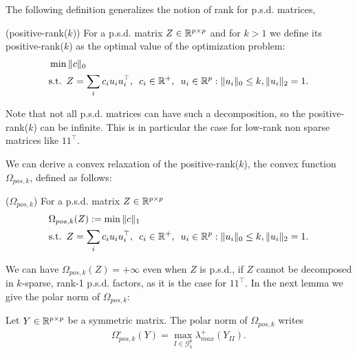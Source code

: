 \documentclass[letterpaper]{article}
\begin{document}
The following definition generalizes the notion of rank for p.s.d. matrices,
\begin{mydef}
(positive-rank($k$)) For a p.s.d. matrix $Z\in\mathbb{R}^{p\times p}$ and for $k>1$ we define its positive-rank($k$) as the optimal
value of the optimization problem:
\begin{align*}
&\min \|c\|_0 \\ 
&\text{s.t.} \enskip Z=\sum_{i} c_i u_i u_{i}^\top, \enskip c_i\in \mathbb{R}^{+}, \enskip u_{i}\in\mathbb{R}^p  :  \|u_{i}\|_0 \leq k, \|u_{i}\|_2 = 1.
\end{align*}
\end{mydef}
Note that not all p.s.d. matrices can have such a decomposition, so the positive-rank($k$) can be infinite. This is in particular the case for low-rank non sparse matrices like $11^{\top}$. 

We can derive a convex relaxation of the positive-rank($k$), the convex function $\Omega_{pos,k}$, defined as follows:
\begin{mydef}
($\Omega_{pos,k}$) For a p.s.d. matrix $Z\in\mathbb{R}^{p\times p}$ 
\begin{align*}
&\Omega_{pos,k}(Z):=\min \|c\|_1 \\ 
&\text{s.t.} \enskip Z=\sum_{i} c_i u_i u_{i}^\top, \enskip 
c_i\in \mathbb{R}^{+}, \enskip u_{i}\in\mathbb{R}^p  :   \|u_{i}\|_0 \leq k, \|u_{i}\|_2 = 1.
\end{align*}
\end{mydef}

We can have $\Omega_{pos,k}(Z)=+\infty$ even when $Z$ is p.s.d., if $Z$ cannot be decomposed in $k$-sparse,  rank-1 p.s.d. factors, as it is the case for $11^{\top}$. In the next lemma we give the polar norm of $\Omega_{pos,k}$:

\begin{lemm}
\label{lem:LMO}
Let $Y\in\mathbb{R}^{p\times p}$ be a symmetric matrix. The polar norm of $\Omega_{pos,k}$ writes
\begin{align}
{\Omega_{pos,k}^{\circ}}(Y)= \max_{I\in\mathcal{G}^p_k}\lambda^{+}_{max}(Y_{II}).
\end{align}
\end{lemm}
\end{document}
